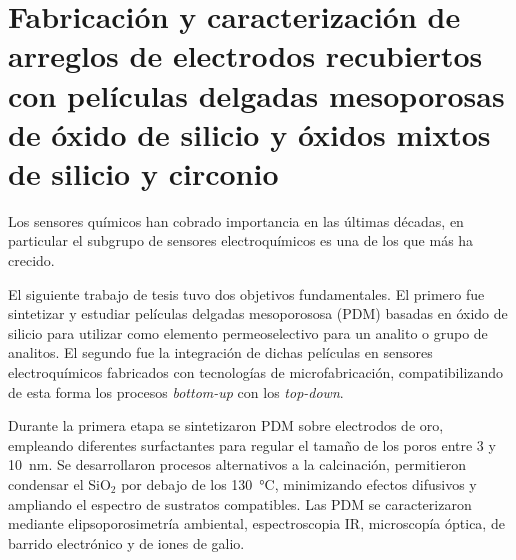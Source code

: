 \mtcaddchapter[Resumen]

\section*{\centering\large{\bfseries{Fabricación y caracterización de arreglos de electrodos recubiertos con películas delgadas mesoporosas de óxido de silicio y óxidos mixtos de silicio y circonio}}}

\vspace*{\fill}
Los sensores químicos han cobrado importancia en las últimas décadas, en particular el subgrupo de sensores electroquímicos es una de los que más ha crecido. 


El siguiente trabajo de tesis tuvo dos objetivos fundamentales. El primero fue sintetizar y estudiar películas delgadas mesoporososa (PDM) basadas en óxido de silicio para utilizar como elemento permeoselectivo para un analito o grupo de analitos. El segundo fue la integración de dichas películas en sensores electroquímicos fabricados con tecnologías de microfabricación, compatibilizando de esta forma los procesos \textit{bottom-up} con los \textit{top-down}.

Durante la primera etapa se sintetizaron PDM sobre electrodos de oro, empleando diferentes surfactantes para regular el tamaño de los poros entre 3 y \SI{10}{\nm}. Se desarrollaron procesos alternativos a la calcinación, permitieron condensar el SiO$_2$ por debajo de los \SI{130}{\celsius}, minimizando efectos difusivos y ampliando el espectro de sustratos compatibles. Las PDM se caracterizaron mediante elipsoporosimetría ambiental, espectroscopia IR, microscopía óptica, de barrido electrónico y de iones de galio.

